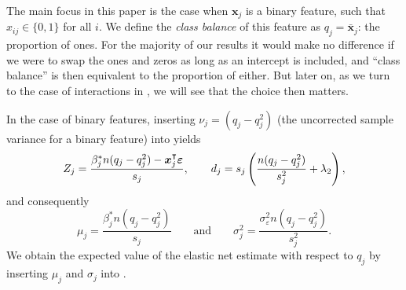 The main focus in this paper is the case when \(\bm{x}_j\) is a binary feature, such that
\(x_{ij} \in \{0, 1\}\) for all \(i\). We define the \emph{class balance} of this feature
as \(q_j = \bar{\bm{x}}_j\): the proportion of ones. For the majority of our results it
would make no difference if we were to swap the ones and zeros as long as an intercept is
included, and ``class balance'' is then equivalent to the proportion of either. But later
on, as we turn to the case of interactions in , we will see that the
choice then matters.

In the case of binary features, inserting \(\nu_j = (q_j - q_j^2)\) (the uncorrected sample
variance for a binary feature) into  yields
\[
  {Z_j} = \frac{\beta_j^* n(q_j - q_j^2) - \boldsymbol{x}_j^\intercal \boldsymbol{\varepsilon}}{s_j}
  ,\qquad
  d_j = s_j\left(\frac{n(q_j - q_j^2)}{s_j^2} + \lambda_2\right),
\]
and consequently
\[
  \mu_j = \frac{\beta^*_j n(q_j - q_j^2)}{s_j}\qquad \text{and} \qquad \sigma_j^2 = \frac{\sigma_\varepsilon^2n(q_j- q_j^2)}{s^2_j}.
\]
%
We obtain the expected value of the elastic net estimate with respect to \(q_j\) by
inserting \(\mu_j\) and \(\sigma_j\) into .

